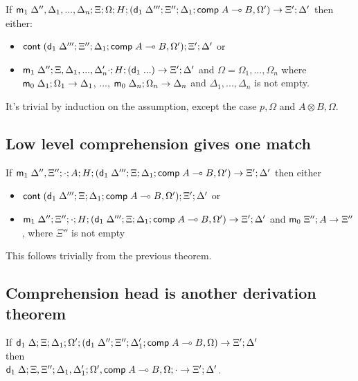\documentclass[9pt]{article}
\begin{document}
If $\mathsf{m}_1 \; \Delta'', \Delta_1, ..., \Delta_n; \Xi; \Omega; H; (\mathsf{d}_1 \; \Delta'''; \Xi''; \Delta_1; \mathsf{comp} \; A \multimap B, \Omega') \rightarrow \Xi'; \Delta'$ then either:

\begin{itemize}
\item $\mathsf{cont} \; (\mathsf{d}_1 \; \Delta'''; \Xi''; \Delta_1; \mathsf{comp} \; A \multimap B, \Omega'); \Xi'; \Delta'$ or
\item $\mathsf{m}_1 \; \Delta''; \Xi, \Delta_1, ..., \Delta_n' \cdot ; H ; (\mathsf{d}_1 \; ...) \rightarrow \Xi'; \Delta'$ and $\Omega = \Omega_1, ..., \Omega_n$ where $\mathsf{m}_0 \; \Delta_1; \Omega_1 \rightarrow \Delta_1$, ..., $\mathsf{m}_0 \; \Delta_n ; \Omega_n \rightarrow \Delta_n$ and $\Delta_1, ..., \Delta_n$ is not empty.
\end{itemize}

It's trivial by induction on the assumption, except the case $p, \Omega$ and $A \otimes B, \Omega$.

\subsection{Low level comprehension gives one match}

If $\mathsf{m}_1 \; \Delta'', \Xi''; \cdot; A ; H; (\mathsf{d}_1 \; \Delta'''; \Xi; \Delta_1; \mathsf{comp} \; A \multimap B, \Omega') \rightarrow \Xi'; \Delta'$ then either

\begin{itemize}
\item $\mathsf{cont} \; (\mathsf{d}_1 \; \Delta'''; \Xi; \Delta_1; \mathsf{comp} \; A \multimap B, \Omega'); \Xi'; \Delta'$ or
\item $\mathsf{m}_1 \; \Delta'' ; \Xi''; \cdot; H; (\mathsf{d}_1 \; \Delta'''; \Xi; \Delta_1; \mathsf{comp} \; A \multimap B, \Omega') \rightarrow \Xi'; \Delta'$ and $\mathsf{m}_0 \; \Xi''; A \rightarrow \Xi''$, where $\Xi''$ is not empty
\end{itemize}

This follows trivially from the previous theorem.

\subsection{Comprehension head is another derivation theorem}

If $\mathsf{d}_1 \; \Delta; \Xi; \Delta_1; \Omega'; (\mathsf{d}_1 \; \Delta''; \Xi''; \Delta'_1; \mathsf{comp} \; A \multimap B, \Omega) \rightarrow \Xi'; \Delta'$ \\ then \\ $\mathsf{d}_1 \; \Delta; \Xi, \Xi''; \Delta_1, \Delta'_1; \Omega', \mathsf{comp} \; A \multimap B, \Omega; \cdot \rightarrow \Xi'; \Delta'$.
\end{document}
